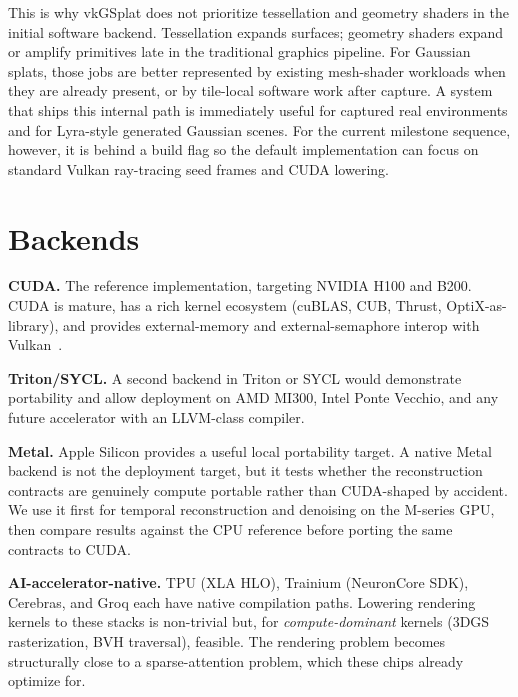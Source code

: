 \documentclass[10pt,journal,onecolumn]{IEEEtran}
\begin{document}
This is why vkGSplat does not prioritize tessellation and geometry shaders in
the initial software backend. Tessellation expands surfaces; geometry shaders
expand or amplify primitives late in the traditional graphics pipeline. For
Gaussian splats, those jobs are better represented by existing mesh-shader
workloads when they are already present, or by tile-local software work after
capture. A system that ships this internal path is immediately useful for
captured real environments and for Lyra-style generated Gaussian scenes. For the
current milestone sequence, however, it is behind a build flag so the default
implementation can focus on standard Vulkan ray-tracing seed frames and CUDA
lowering.

\section{Backends}\label{sec:backends}

\textbf{CUDA.} The reference implementation, targeting NVIDIA H100 and
B200. CUDA is mature, has a rich kernel ecosystem (cuBLAS, CUB, Thrust,
OptiX-as-library), and provides external-memory and external-semaphore
interop with Vulkan~\cite{nvidia2020vkcuda}.

\textbf{Triton\slash SYCL.} A second backend in Triton or SYCL would
demonstrate portability and allow deployment on AMD MI300, Intel Ponte
Vecchio, and any future accelerator with an LLVM-class compiler.

\textbf{Metal.} Apple Silicon provides a useful local portability
target. A native Metal backend is not the deployment target, but it
tests whether the reconstruction contracts are genuinely compute
portable rather than CUDA-shaped by accident. We use it first for
temporal reconstruction and denoising on the M-series GPU, then compare
results against the CPU reference before porting the same contracts to
CUDA.

\textbf{AI-accelerator-native.} TPU (XLA HLO), Trainium (NeuronCore SDK),
Cerebras, and Groq each have native compilation paths. Lowering rendering
kernels to these stacks is non-trivial but, for \emph{compute-dominant}
kernels (3DGS rasterization, BVH traversal), feasible. The rendering
problem becomes structurally close to a sparse-attention problem, which
these chips already optimize for.

\end{document}
